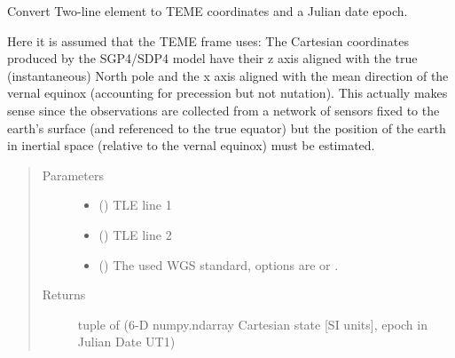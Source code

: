 \documentclass[letterpaper,10pt,english]{sphinxmanual}
\begin{document}

\begin{fulllineitems}
\label{\detokenize{modules/TLE_tools:TLE_tools.TLE_to_TEME}}
Convert Two-line element to TEME coordinates and a Julian date epoch.

Here it is assumed that the TEME frame uses:
The Cartesian coordinates produced by the SGP4/SDP4 model have their z
axis aligned with the true (instantaneous) North pole and the x axis
aligned with the mean direction of the vernal equinox (accounting for
precession but not nutation). This actually makes sense since the
observations are collected from a network of sensors fixed to the
earth’s surface (and referenced to the true equator) but the position
of the earth in inertial space (relative to the vernal equinox) must
be estimated.
\begin{quote}\begin{description}
\item[{Parameters}] \leavevmode\begin{itemize}
\item {} 
 () \textendash{} TLE line 1

\item {} 
 () \textendash{} TLE line 2

\item {} 
 () \textendash{} The used WGS standard, options are  or .

\end{itemize}

\item[{Returns}] \leavevmode
tuple of (6-D numpy.ndarray Cartesian state {[}SI units{]}, epoch in Julian Date UT1)

\end{description}\end{quote}

\end{fulllineitems}

\end{document}
